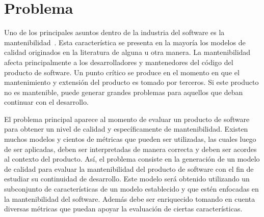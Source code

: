 

\chapter{Problema}

Uno de los principales asuntos dentro de la industria del software es la
mantenibilidad~\cite{Coleman:1994}. Esta característica se presenta en la mayoría los
modelos de calidad originados en la literatura de alguna u otra manera.
La mantenibilidad afecta principalmente a los desarrolladores y mantenedores del código
del producto de software.
Un punto crítico se produce en el momento en que el mantenimiento y extensión del producto
es tomado por terceros. Si este producto no es mantenible, puede generar grandes problemas
para aquellos que deban continuar con el desarrollo.

El problema principal aparece al momento de evaluar un producto de software
para obtener un nivel de calidad y específicamente de mantenibilidad. Existen
muchos modelos y cientos de métricas que pueden ser utilizadas, las cuales
luego de ser aplicadas, deben ser interpretadas de manera correcta y deben ser acordes
al contexto del producto. Así, el problema consiste en la generación
de un modelo de calidad para evaluar la mantenibilidad del producto de software
con el fin de estudiar su continuidad de desarrollo. Este modelo será obtenido
utilizando un subconjunto de características de un modelo establecido y que
estén enfocadas en la mantenibilidad del software. Además debe ser enriquecido
tomando en cuenta diversas métricas que puedan apoyar la evaluación de ciertas
características.
